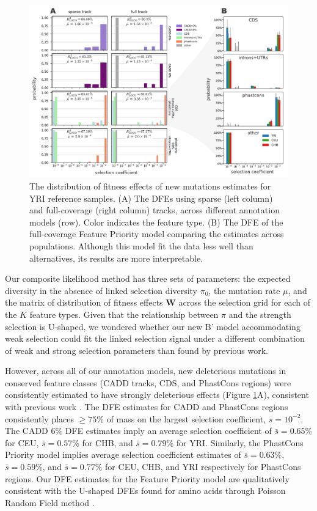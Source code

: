 \documentclass[11pt]{article}
\begin{document}
\begin{figure}[htbp] \centering
    \includegraphics[width=\textwidth]{figures/figure_4.pdf} 

    \caption{The distribution of fitness effects of new mutations estimates for
        YRI reference samples. (A) The DFEs using sparse (left column) and
        full-coverage (right column) tracks, across different annotation models
        (row). Color indicates the feature type. (B) The DFE of the
    full-coverage Feature Priority model comparing the estimates across
populations. Although this model fit the data less well than alternatives, its
results are more interpretable.}

  \label{fig:figure-4}
\end{figure}

Our composite likelihood method has three sets of parameters: the expected
diversity in the absence of linked selection diversity $\pi_0$, the mutation
rate $\mu$, and the matrix of distribution of fitness effects $\mathbf{W}$
across the selection grid for each of the $K$ feature types. Given that the
relationship between $\pi$ and the strength selection is U-shaped, we wondered
whether our new B' model accommodating weak selection could fit the linked
selection signal under a different combination of weak and strong selection
parameters than found by previous work.

However, across all of our annotation models, new deleterious mutations in
conserved feature classes (CADD tracks, CDS, and PhastCons regions) were
consistently estimated to have strongly deleterious effects (Figure
\ref{fig:figure-4}A), consistent with previous work
\parencite{McVicker2009-ax,Murphy2022-sj}. The DFE estimates for CADD and
PhastCons regions consistently places $\ge 75\%$ of mass on the largest
selection coefficient, $s=10^{-2}$. The CADD 6\% DFE estimates imply an average
selection coefficient of $\bar{s} = 0.65\%$ for CEU, $\bar{s} = 0.57\%$ for
CHB, and $\bar{s} = 0.79\%$ for YRI. Similarly, the PhastCons Priority model
implies average selection coefficient estimates of $\bar{s} = 0.63\%$, $\bar{s}
= 0.59\%$, and $\bar{s}= 0.77\%$ for CEU, CHB, and YRI respectively for
PhastCons regions. Our DFE estimates for the Feature Priority model are
qualitatively consistent with the U-shaped DFEs found for amino acids through
Poisson Random Field method \parencite{Boyko2008-tj}.
\end{document}
